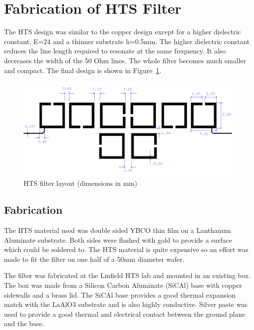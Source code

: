
\section{Fabrication of HTS Filter}
The HTS design was similar to the copper design except for a higher dielectric constant, E=24 and a thinner substrate h=0.5mm. The higher dielectric constant reduces the line length required to resonate at the same frequency. It also decreases the width of the 50 Ohm lines. The whole filter becomes much smaller and compact. The final design is shown in Figure~\ref{figure:design-hts-layout}.

\begin{figure}[ht]
\begin{center}
\includegraphics[scale=0.3]{fig/design-hts-layout.pdf}
\end{center}
\vspace{-1em}
\caption{HTS filter layout (dimensions in mm)}
\label{figure:design-hts-layout}
\end{figure}


\subsection{Fabrication}
The HTS material used was double sided YBCO thin film on a Lanthanum Aluminate substrate. Both sides were flashed with gold to provide a surface which could be soldered to. The HTS material is quite expensive so an effort was made to fit the filter on one half of a 50mm diameter wafer.

The filter was fabricated at the Linfield HTS lab and mounted in an existing box. The box was made from a Silicon Carbon Aluminate (SiCAl) base with copper sidewalls and a brass lid. The SiCAl base provides a good thermal expansion match with the LaAlO3 substrate and is also highly conductive. Silver paste was used to provide a good thermal and electrical contact between the ground plane and the base.

